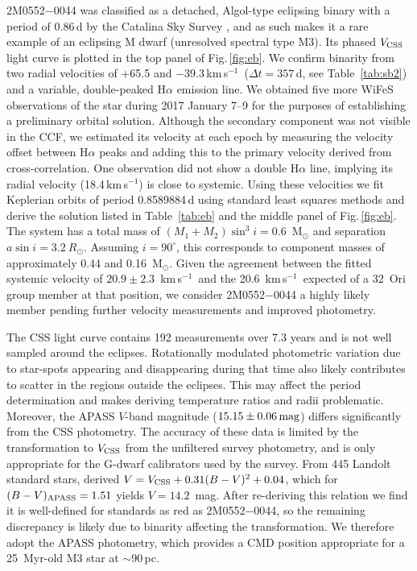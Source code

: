\documentclass[usenatbib]{mnras}
\newcommand{\kms}{\textrm{km\,s$^{-1}$}}
\begin{document}
2M0552$-$0044 was classified as a detached, Algol-type eclipsing
binary with a period of 0.86\,d by the Catalina Sky Survey
\citep[CSS; ][]{Drake14}, and as such makes it a rare example of an eclipsing
M dwarf (unresolved spectral type M3).
Its phased $V_{\rm CSS}$ light curve is plotted in the top panel of Fig.\,\ref{fig:eb}. We confirm binarity from two radial 
velocities of +65.5 and $-$39.3\,\kms\ ($\Delta t=357$\,d, see
Table~\ref{tab:sb2}) and a variable, double-peaked H$\alpha$ emission
line.  We obtained five more WiFeS observations of the star during 2017 January 7--9 for the purposes of establishing a preliminary orbital solution. Although the secondary component was not visible in the CCF, we estimated its velocity at each epoch by measuring the velocity offset between H$\alpha$ peaks and adding this to the primary velocity derived from cross-correlation. One observation did not show a double H$\alpha$ line, implying its radial velocity (18.4\,\kms) is close to systemic. Using these velocities we fit Keplerian orbits of period 0.8589884\,d \citep{Drake14} using standard least squares methods and derive the solution listed in Table~\ref{tab:eb} and the middle panel of Fig.\,\ref{fig:eb}. The system has a total mass of $(M_{1}+M_{2})\sin^3 i=0.6$~M$_{\odot}$ and separation $a\sin i=3.2~R_{\odot}$. Assuming $i=90^{\circ}$, this corresponds to component masses of approximately 0.44 and 0.16~M$_{\odot}$. Given the agreement between the fitted systemic velocity of $20.9\pm2.3$~\kms\ and the 20.6~\kms\ expected of a 32~Ori group member at that position, we consider 2M0552$-$0044 a highly likely member pending further velocity measurements and improved photometry.

The CSS light curve contains 192 measurements over 7.3 years and is not well sampled around the eclipses. Rotationally modulated photometric variation due to star-spots appearing and disappearing during that time also likely contributes to scatter in the regions outside the eclipses. This may affect the period determination and makes deriving temperature ratios and radii problematic. Moreover,  the APASS $V$-band magnitude ($15.15\pm0.06\,\rm{mag}$) differs
significantly from the CSS photometry.  The
accuracy of these data is limited by the transformation to $V_{\rm CSS}$
from the unfiltered survey photometry, and is only appropriate for the
G-dwarf calibrators used by the survey. From 445 Landolt standard
stars, \citet{Drake13} derived $V = V_{\rm CSS} + 0.31(B-V)^{2} +
0.04$, which for $(B-V)_{\rm APASS}=1.51$ yields
$V=14.2$~mag. After re-deriving this relation we find it is
well-defined for standards as red as 2M0552$-$0044, so the remaining discrepancy is likely due to binarity affecting the transformation. We therefore 
 adopt the APASS photometry, which provides a CMD position
appropriate for a 25~Myr-old M3 star at $\sim$90\,pc.
\end{document}
